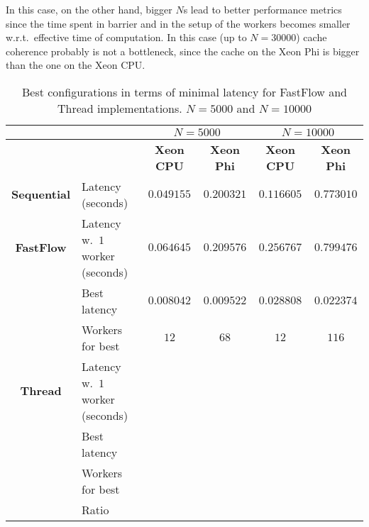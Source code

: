 In this case, on the other hand, bigger $N$s lead to better performance metrics since the time spent in barrier and in the setup of the workers becomes smaller w.r.t.\ effective time of computation.
In this case (up to $N = 30000$) cache coherence probably is not a bottleneck, since the cache on the Xeon Phi is bigger than the one on the Xeon CPU.
\begin{table}
	\centering
	\begin{tabular}{clcccc}  
		\toprule
		 & & \multicolumn{2}{c}{\textbf{$N = 5000$}} & \multicolumn{2}{c}{\textbf{$N = 10000$}}\\
		\midrule
		 & & \textbf{Xeon CPU} & \textbf{Xeon Phi} & \textbf{Xeon CPU} & \textbf{Xeon Phi}\\
		\cmidrule{3-6}		
		\textbf{Sequential} & Latency (\si{seconds})& $0.049155$& $0.200321$ & $0.116605$& $0.773010$\\
		\midrule
		\textbf{FastFlow} & Latency w.\ $1$ worker (\si{seconds}) & $0.064645$ & $0.209576$ & $0.256767$ & $0.799476$\\
		 & Best latency & $0.008042$ & $0.009522$ & $0.028808$ & $0.022374$\\
		 & Workers for best & $12$ & $68$ & $12$ & $116$\\
		\midrule
		\textbf{Thread} &Latency w.\ $1$ worker (\si{seconds}) & $ $ & $ $ & $ $ & $ $\\
				& Best latency & $ $ & $ $ & $ $ & $ $\\
				& Workers for best & $ $ & $ $ & $ $ & $ $ \\
				& Ratio & $ $ & $ $ & $ $ & $ $ \\
		\bottomrule
	\end{tabular}
	\caption{Best configurations in terms of minimal latency for FastFlow and Thread implementations. $N = 5000$ and $N=10000$}
	\label{tab:res0}
\end{table}

